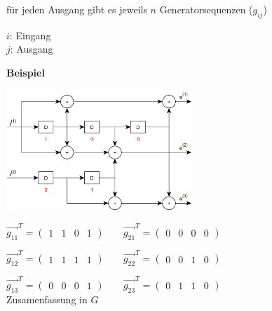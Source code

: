 für jeden Ausgang gibt es jeweils $n$ Generatorsequenzen ($g_{ij}$)

$i$: Eingang\\
$j$: Ausgang

\textbf{Beispiel}

\includegraphics[width=7cm]{img/faltungscoder2in3out.PNG}

$\displaystyle{
    \vec{g_{11}}^T = \begin{pmatrix}
        1 & 1 & 0 & 1
    \end{pmatrix}
    \;\;\;\;\;\;\;
    \vec{g_{21}}^T = \begin{pmatrix}
        0 & 0 & 0 & 0
    \end{pmatrix}
}$

$\displaystyle{
    \vec{g_{12}}^T = \begin{pmatrix}
        1 & 1 & 1 & 1
    \end{pmatrix}
    \;\;\;\;\;\;\;
    \vec{g_{22}}^T = \begin{pmatrix}
        0 & 0 & 1 & 0
    \end{pmatrix}
}$

$\displaystyle{
    \vec{g_{13}}^T = \begin{pmatrix}
        0 & 0 & 0 & 1
    \end{pmatrix}
    \;\;\;\;\;\;\;
    \vec{g_{23}}^T = \begin{pmatrix}
        0 & 1 & 1 & 0
    \end{pmatrix}
}$
\\

Zusamenfassung in $G$

